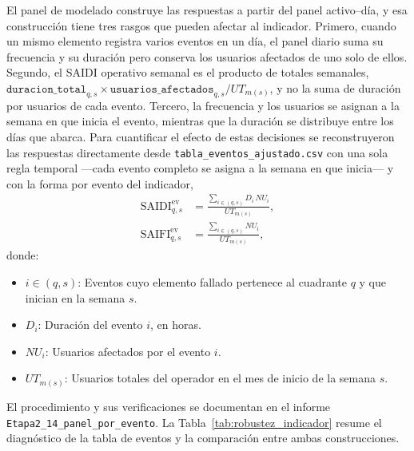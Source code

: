 El panel de modelado construye las respuestas a partir del panel activo--día, y esa construcción tiene tres rasgos que pueden afectar al indicador. Primero, cuando un mismo elemento registra varios eventos en un día, el panel diario suma su frecuencia y su duración pero conserva los usuarios afectados de uno solo de ellos. Segundo, el SAIDI operativo semanal es el producto de totales semanales, $\texttt{duracion\_total}_{q,s}\times\texttt{usuarios\_afectados}_{q,s}/UT_{m(s)}$, y no la suma de duración por usuarios de cada evento. Tercero, la frecuencia y los usuarios se asignan a la semana en que inicia el evento, mientras que la duración se distribuye entre los días que abarca. Para cuantificar el efecto de estas decisiones se reconstruyeron las respuestas directamente desde \texttt{tabla\_eventos\_ajustado.csv} con una sola regla temporal ---cada evento completo se asigna a la semana en que inicia--- y con la forma por evento del indicador,
\begin{equation}
    \begin{aligned}
    \mathrm{SAIDI}^{\mathrm{ev}}_{q,s} &= \frac{\sum_{i \in (q,s)} D_i\,NU_i}{UT_{m(s)}}, \\[4pt]
    \mathrm{SAIFI}^{\mathrm{ev}}_{q,s} &= \frac{\sum_{i \in (q,s)} NU_i}{UT_{m(s)}},
    \end{aligned}
    \label{eq:indicador_por_evento}
\end{equation}
donde:
\begin{itemize}
    \item $i \in (q,s)$: Eventos cuyo elemento fallado pertenece al cuadrante $q$ y que inician en la semana $s$.
    \item $D_i$: Duración del evento $i$, en horas.
    \item $NU_i$: Usuarios afectados por el evento $i$.
    \item $UT_{m(s)}$: Usuarios totales del operador en el mes de inicio de la semana $s$.
\end{itemize}
El procedimiento y sus verificaciones se documentan en el informe \texttt{Etapa2\_14\_panel\_por\_evento}. La Tabla~\ref{tab:robustez_indicador} resume el diagnóstico de la tabla de eventos y la comparación entre ambas construcciones.

